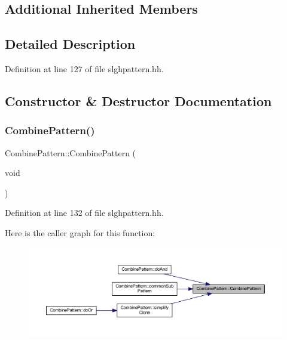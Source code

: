 \subsection*{Additional Inherited Members}


\subsection{Detailed Description}


Definition at line 127 of file slghpattern.\+hh.



\subsection{Constructor \& Destructor Documentation}
\mbox{\label{class_combine_pattern_ac3956178a5fd7ae501bae3bc08607565}} 
\subsubsection{\texorpdfstring{CombinePattern()}{CombinePattern()}\hspace{0.1cm}{\footnotesize\ttfamily [1/2]}}
{\footnotesize\ttfamily Combine\+Pattern\+::\+Combine\+Pattern (\begin{DoxyParamCaption}\item[{void}]{ }\end{DoxyParamCaption})\hspace{0.3cm}{\ttfamily [inline]}}



Definition at line 132 of file slghpattern.\+hh.

Here is the caller graph for this function\+:
\nopagebreak
\begin{figure}[H]
\begin{center}
\leavevmode
\includegraphics[width=350pt]{class_combine_pattern_ac3956178a5fd7ae501bae3bc08607565_icgraph}
\end{center}
\end{figure}
\mbox{\label{class_combine_pattern_ab61418aafbbfff57b1886964d61b1a17}} 

